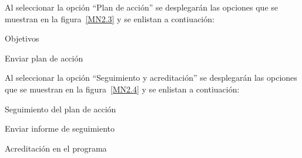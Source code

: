
 Al seleccionar la opción ``Plan de acción'' se desplegarán las opciones que se muestran en la figura~\ref{MN2.3} y se enlistan a contiuación: 
    \begin{Citemize}
		\item Objetivos
		\item Enviar plan de acción
    \end{Citemize}


 Al seleccionar la opción ``Seguimiento y acreditación'' se desplegarán las opciones que se muestran en la figura~\ref{MN2.4} y se enlistan a contiuación: 
    \begin{Citemize}
		\item Seguimiento del plan de acción
		\item Enviar informe de seguimiento
		\item Acreditación en el programa
    \end{Citemize}
